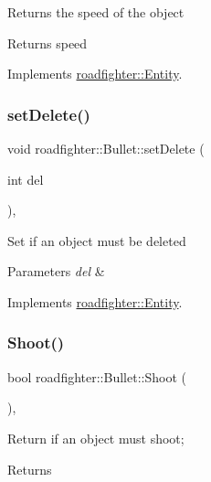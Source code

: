 Returns the speed of the object \begin{DoxyReturn}{Returns}
speed 
\end{DoxyReturn}


Implements \hyperlink{classroadfighter_1_1Entity_ad3760184d764a61922e1db7d98501ee4}{roadfighter\+::\+Entity}.

\mbox{\label{classroadfighter_1_1Bullet_ac3be16d9ff7da992fc6c5bd641f6d8dc}} 
\subsubsection{\texorpdfstring{set\+Delete()}{setDelete()}}
{\footnotesize\ttfamily void roadfighter\+::\+Bullet\+::set\+Delete (\begin{DoxyParamCaption}\item[{int}]{del }\end{DoxyParamCaption})\hspace{0.3cm}{\ttfamily [override]}, {\ttfamily [virtual]}}

Set if an object must be deleted 
\begin{DoxyParams}{Parameters}
{\em del} & \\
\hline
\end{DoxyParams}


Implements \hyperlink{classroadfighter_1_1Entity_a07e973f0fa941a69e749629716877692}{roadfighter\+::\+Entity}.

\mbox{\label{classroadfighter_1_1Bullet_a0c093704ce5b9c2f4237d6b5dd1cbd36}} 
\subsubsection{\texorpdfstring{Shoot()}{Shoot()}}
{\footnotesize\ttfamily bool roadfighter\+::\+Bullet\+::\+Shoot (\begin{DoxyParamCaption}{ }\end{DoxyParamCaption})\hspace{0.3cm}{\ttfamily [override]}, {\ttfamily [virtual]}}

Return if an object must shoot; \begin{DoxyReturn}{Returns}

\end{DoxyReturn}


